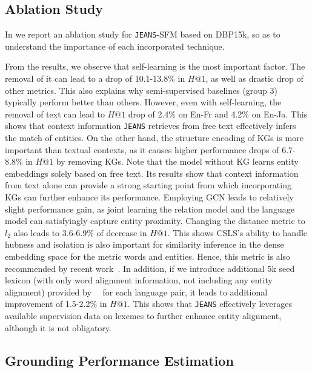 \documentclass[11pt,a4paper]{article}
\makeatletter
\newcommand{\modelname}[0]{\texttt{JEANS}\xspace}
\def\hitsone{\mathit{H}\mbox{@}1}
\makeatother
\begin{document}
\subsection{Ablation Study}

In  we report an ablation study for \modelname-SFM based on DBP15k, so as to understand the importance of each incorporated technique.




From the results, we observe that self-learning is the most important factor.
The removal of it can lead to a drop of 10.1-13.8\% in $\hitsone$, as well as drastic drop of other metrics.
This also explains why semi-supervised baselines (group 3) typically perform better than others.
However, even with self-learning, the removal of text can lead to $\hitsone$ drop of 2.4\% on En-Fr and 4.2\% on En-Ja.
This shows that context information \modelname retrieves from free text effectively infers the match of entities.
On the other hand, the structure encoding of KGs is more important than textual contexts,
as it causes higher performance drops of 6.7-8.8\% in $\hitsone$ by removing KGs.
Note that the model without KG learns entity embeddings solely based on free text. Its results show that context information from text alone can provide a strong starting point from which incorporating KGs can further enhance its performance.
Employing GCN leads to relatively slight performance gain, as joint learning the relation model and the language model can satisfyingly capture entity proximity.
Changing the distance metric to $l_2$ also leads to 3.6-6.9\% of decrease in $\hitsone$.
This shows CSLS's ability to handle hubness and isolation is also important for similarity inference in the dense embedding space for the metric words and entities.
Hence, this metric is also recommended by recent work~\cite{sun2020alinet,sun2019transedge,zhang2019multi}. 
In addition, if we introduce additional 5k seed lexicon (with only word alignment information, not including any entity alignment) provided by~\citeauthor{conneau2018word}~ for each language pair, it leads to additional improvement of 1.5-2.2\% in $\hitsone$.
This shows that \modelname effectively leverages available supervision data on lexemes to further enhance entity alignment, although it is not obligatory.





\subsection{Grounding Performance Estimation}\label{sup:grounding}
\end{document}
